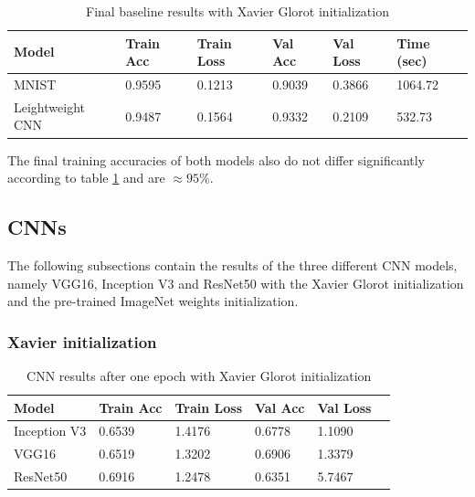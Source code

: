 \documentclass{article}
\theoremstyle{definition}
\theoremstyle{remark}
\begin{document}
\begin{table}[h!]
\center
\begin{tabular}{|l|l|l|l|l|l|}
\hline
\textbf{Model} & \textbf{Train Acc} & \textbf{Train Loss} & \textbf{Val Acc} & \textbf{Val Loss} & \textbf{Time (sec)}\\ \hline
MNIST		    & 0.9595 		 & 0.1213      & 0.9039		  & 0.3866	 &	1064.72\\ \hline
Leightweight CNN    & 0.9487   	 & 0.1564 	   & 0.9332		  &	0.2109	 &  532.73 \\ \hline
\end{tabular}
\caption{Final baseline results with Xavier Glorot initialization}
\label{tab:final_baseline_results_xavier}
\end{table}

The final training accuracies of both models also do not differ significantly according to table \ref{tab:final_baseline_results_xavier} and are $\approx 95\%$.

\newpage

\subsection{CNNs}

The following subsections contain the results of the three different CNN models, namely VGG16, Inception V3 and ResNet50 with the Xavier Glorot initialization and the pre-trained ImageNet weights initialization.


\subsubsection{Xavier initialization}



\begin{table}[h!]
\center
\begin{tabular}{|l|l|l|l|l|l|}
\hline
\textbf{Model} & \textbf{Train Acc} & \textbf{Train Loss} & \textbf{Val Acc} & \textbf{Val Loss}\\ \hline
Inception V3 & 0.6539 	& 1.4176 	 &  0.6778	 & 1.1090\\ \hline
VGG16  		& 0.6519   	& 1.3202     &  0.6906	 &	1.3379\\ \hline
ResNet50  	& 0.6916  	& 1.2478 	 &  0.6351	 &	5.7467\\ \hline
\end{tabular}
\caption{CNN results after one epoch with Xavier Glorot initialization}
\label{tab:one_epoch_cnn_results_xavier}
\end{table}
\end{document}

